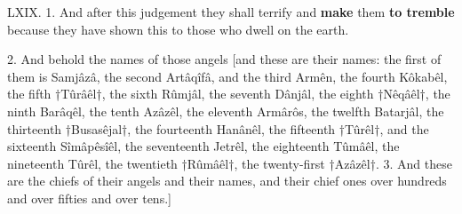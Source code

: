 
LXIX. 1. And after this judgement they shall
terrify and \textbf{make} them \textbf{to tremble} because they
have shown this to those who dwell on the earth.

2. And behold the names of those angels [and
these are their names: the first of them is Samjâzâ,
the second Artâqîfâ, and the third Armên, the fourth
Kôkabêl, the fifth †Tûrâêl†, the sixth Rûmjâl, the
seventh Dânjâl, the eighth †Nêqâêl†, the ninth
Barâqêl, the tenth Azâzêl, the eleventh Armârôs,
the twelfth Batarjâl, the thirteenth †Busasêjal†,
the fourteenth Hanânêl, the fifteenth †Tûrêl†, and
the sixteenth Sîmâpêsîêl, the seventeenth Jetrêl,
the eighteenth Tûmâêl, the nineteenth Tûrêl, the
twentieth †Rûmâêl†, the twenty-first †Azâzêl†.
3. And these are the chiefs of their angels and their
names, and their chief ones over hundreds and over
fifties and over tens.]


